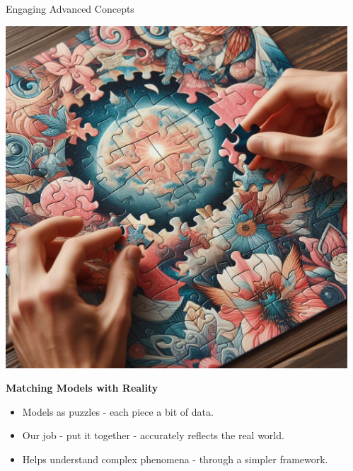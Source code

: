 \documentclass[final]{beamer}
\begin{document}
\begin{frame}[t]{}
\begin{columns}[t]
\begin{column}{.3\textwidth}
\begin{block}{Engaging Advanced Concepts}
				\vspace{2.5cm}

				\begin{minipage}{0.28\textwidth}
					\centering
					\includegraphics[width=\linewidth]{./images/1-2-3-Puzzles.jpeg}
				\end{minipage}
				\hfill
				\begin{minipage}{0.7\textwidth}
					\textbf{Matching Models with Reality}
					\begin{itemize}
						\item Models as puzzles - each piece a bit of data.
						\item Our job - put it together - accurately reflects the real world.
						\item Helps understand complex phenomena - through a simpler framework.
					\end{itemize}
				\end{minipage}

				\vspace{1.4cm}

			\end{block}

		\end{column}

		\begin{column}{.33\textwidth}


\end{column}
\end{columns}
\end{frame}
\end{document}
